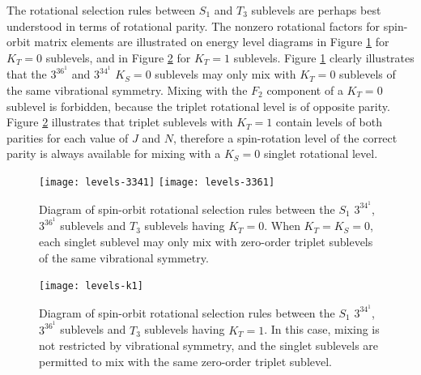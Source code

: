 \documentclass[12pt]{mitthesis}
\begin{document}

The rotational selection rules between $S_1$ and $T_3$ sublevels are
perhaps best understood in terms of rotational parity.  The nonzero
rotational factors for spin-orbit matrix elements are illustrated on
energy level diagrams in Figure \ref{fig:levels-k0} for $K_T=0$
sublevels, and in Figure \ref{fig:levels-k1} for $K_T=1$ sublevels.
Figure \ref{fig:levels-k0} clearly illustrates that the $3^36^1$ and
$3^34^1$ $K_S=0$ sublevels may only mix with $K_T=0$ sublevels of the
same vibrational symmetry.  Mixing with the $F_2$ component of a
$K_T=0$ sublevel is forbidden, because the triplet rotational level is
of opposite parity.  Figure \ref{fig:levels-k1} illustrates that
triplet sublevels with $K_T=1$ contain levels of both parities for
each value of $J$ and $N$, therefore a spin-rotation level of the
correct parity is always available for mixing with a $K_S=0$ singlet
rotational level.



\begin{figure}
  \caption{Diagram of spin-orbit rotational selection rules between
    the $S_1$ $3^34^1$, $3^36^1$  sublevels and $T_3$ sublevels
    having $K_T=0$.  When $K_T=K_S=0$, each singlet sublevel may only
    mix with zero-order triplet sublevels of the same vibrational
    symmetry.}
  \label{fig:levels-k0}
  \centering
  \vspace{5mm}
  \texttt{[image: levels-3341]}
  \texttt{[image: levels-3361]}  
\end{figure}

\begin{figure}
  \caption{Diagram of spin-orbit rotational selection rules between
    the $S_1$ $3^34^1$, $3^36^1$  sublevels and $T_3$ sublevels
    having $K_T=1$.  In this case, mixing is not restricted by
    vibrational symmetry, and the singlet sublevels are permitted to
    mix with the same zero-order triplet sublevel.}
  \label{fig:levels-k1}
  \centering
  \vspace{5mm}
  \texttt{[image: levels-k1]}
\end{figure}

\end{document}
